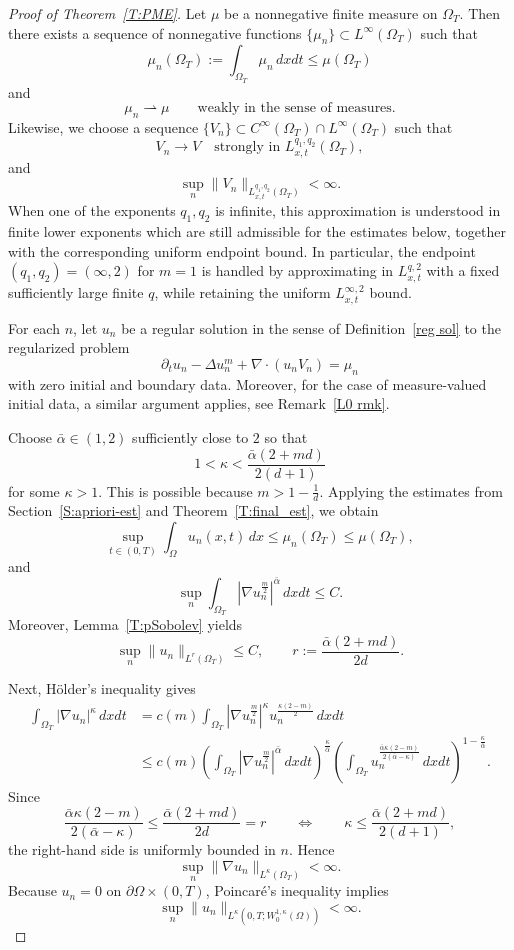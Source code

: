 \documentclass{amsart}
\numberwithin{equation}{section}
\begin{document}
\begin{proof}[Proof of Theorem~\ref{T:PME}]
Let $\mu$ be a nonnegative finite measure on $\Omega_T$. Then there exists a sequence of nonnegative functions $\{\mu_n\}\subset L^\infty(\Omega_T)$ such that
\[
\mu_n(\Omega_T):=\int_{\Omega_T}\mu_n\,dxdt \le \mu(\Omega_T)
\]
and
\[
\mu_n \rightharpoonup \mu
\qquad \text{weakly in the sense of measures.}
\]
Likewise, we choose a sequence $\{V_n\}\subset C^\infty(\Omega_{T})\cap L^\infty(\Omega_T)$ such that
\[
V_n \to V
\quad \text{strongly in } L_{x,t}^{q_1,q_2}(\Omega_T),
\]
and
\[
\sup_n \|V_n\|_{L_{x,t}^{q_1,q_2}(\Omega_T)}<\infty.
\]
When one of the exponents $q_1,q_2$ is infinite, this approximation is understood in finite lower exponents which are still admissible for the estimates below, together with the corresponding uniform endpoint bound. In particular, the endpoint $(q_1,q_2)=(\infty,2)$ for $m=1$ is handled by approximating in $L_{x,t}^{q,2}$ with a fixed sufficiently large finite $q$, while retaining the uniform $L_{x,t}^{\infty,2}$ bound.

For each $n$, let $u_n$ be a regular solution in the sense of Definition~\ref{reg sol} to the regularized problem
\begin{equation}\label{reg-PME}
\partial_t u_n-\Delta u_n^m+\nabla\cdot(u_nV_n)=\mu_n
\end{equation}
with zero initial and boundary data. Moreover, for the case of measure-valued initial data, a similar argument applies, see Remark~\ref{L0 rmk}.

Choose $\bar\alpha\in(1,2)$ sufficiently close to $2$ so that
\[
1<\kappa<\frac{\bar\alpha(2+md)}{2(d+1)}
\]
for some $\kappa>1$. This is possible because $m>1-\frac1d$.
Applying the estimates from Section~\ref{S:apriori-est} and Theorem~\ref{T:final_est}, we obtain
\[
\sup_{t\in(0,T)}\int_\Omega u_n(x,t)\,dx
\le
\mu_n(\Omega_T)
\le
\mu(\Omega_T),
\]
and
\[
\sup_n
\int_{\Omega_T}\left|\nabla u_n^{\frac m2}\right|^{\bar\alpha}\,dxdt
\le C.
\]
Moreover, Lemma~\ref{T:pSobolev} yields
\[
\sup_n \|u_n\|_{L^r(\Omega_T)}\le C,
\qquad
r:=\frac{\bar\alpha(2+md)}{2d}.
\]

Next, H\"{o}lder's inequality gives
\[
\begin{aligned}
\int_{\Omega_T} |\nabla u_n|^\kappa\,dxdt
&=
c(m)\int_{\Omega_T}
\left|\nabla u_n^{\frac m2}\right|^\kappa
u_n^{\frac{\kappa(2-m)}{2}}
\,dxdt \\
&\le
c(m)
\left(\int_{\Omega_T}\left|\nabla u_n^{\frac m2}\right|^{\bar\alpha}\,dxdt\right)^{\frac{\kappa}{\bar\alpha}}
\left(\int_{\Omega_T}u_n^{\frac{\bar\alpha \kappa(2-m)}{2(\bar\alpha-\kappa)}}\,dxdt\right)^{1-\frac{\kappa}{\bar\alpha}}.
\end{aligned}
\]
Since
\[
\frac{\bar\alpha \kappa(2-m)}{2(\bar\alpha-\kappa)}
\le
\frac{\bar\alpha(2+md)}{2d}=r
\qquad \Longleftrightarrow \qquad
\kappa\le \frac{\bar\alpha(2+md)}{2(d+1)},
\]
the right-hand side is uniformly bounded in $n$. Hence
\[
\sup_n \|\nabla u_n\|_{L^\kappa(\Omega_T)}<\infty.
\]
Because $u_n=0$ on $\partial\Omega\times(0,T)$, Poincar\'e's inequality implies
\[
\sup_n \|u_n\|_{L^\kappa(0,T;W_0^{1,\kappa}(\Omega))}<\infty.
\]


\end{proof}
\end{document}

